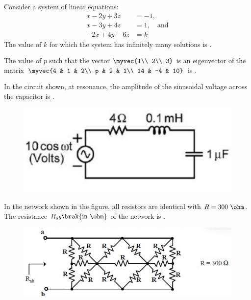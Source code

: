     \item Consider a system of linear equations:
    \begin{align*}
        x-2y+3z &= -1, \\
        x-3y+4z &= 1, \quad \text{and} \\
        -2x+4y-6z &= k
    \end{align*}
    The value of $k$ for which the system has infinitely many solutions is \underline{\hspace{2cm}}.
    \hfill{}
    \item The value of $p$ such that the vector $\myvec{1\\ 2\\ 3}$ is an eigenvector of the matrix $\myvec{4 & 1 & 2\\ p & 2 & 1\\ 14 & -4 & 10}$ is \underline{\hspace{2cm}}.
    \hfill{}

    \item In the circuit shown, at resonance, the amplitude of the sinusoidal voltage  across the capacitor is \underline{\hspace{2cm}}.
    \begin{figure}[H]
        \centering
        \includegraphics[width=0.4\columnwidth]{figs/q16.png}
        \caption*{}
        \label{fig:q16}
    \end{figure}
    
    \hfill{}

    \item In the network shown in the figure, all resistors are identical with $R=300~\ohm$. The resistance $R_{ab} \brak{\text{in } \ohm}$ of the network is \underline{\hspace{2cm}}.
    \begin{figure}[H]
        \centering
        \includegraphics[width=0.6\columnwidth]{figs/q17.png}
        \caption*{}
        \label{fig:q17}
    \end{figure}
    
